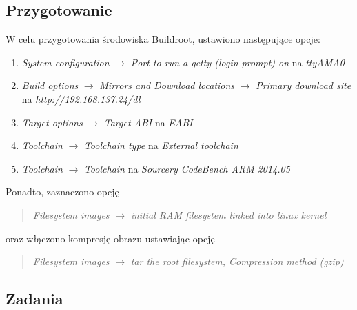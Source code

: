 \documentclass[10pt,a4paper]{article}
\begin{document}
\subsection{Przygotowanie}
W celu przygotowania środowiska Buildroot, ustawiono następujące opcje:
\begin{enumerate}
	\item \textit{System configuration} $\rightarrow$ \textit{Port to run a getty (login prompt) on} na \textit{ttyAMA0}
	\item \textit{Build options} $\rightarrow$ \textit{Mirrors and Download locations} $\rightarrow$ \textit{Primary download site}\\
	na \textit{http://192.168.137.24/dl}
	\item \textit{Target options} $\rightarrow$ \textit{Target ABI} na \textit{EABI}
	\item \textit{Toolchain} $\rightarrow$ \textit{Toolchain type} na \textit{External toolchain}
	\item \textit{Toolchain} $\rightarrow$ \textit{Toolchain} na \textit{Sourcery CodeBench ARM 2014.05}
\end{enumerate}
Ponadto, zaznaczono opcję
\begin{quote}
	\textit{Filesystem images} $\rightarrow$ \textit{initial RAM filesystem linked into linux kernel}
\end{quote}
oraz włączono kompresję obrazu ustawiając opcję
\begin{quote}
	\textit{Filesystem images} $\rightarrow$ \textit{tar the root filesystem, Compression method (gzip)}
\end{quote}

\subsection{Zadania}
\end{document}
